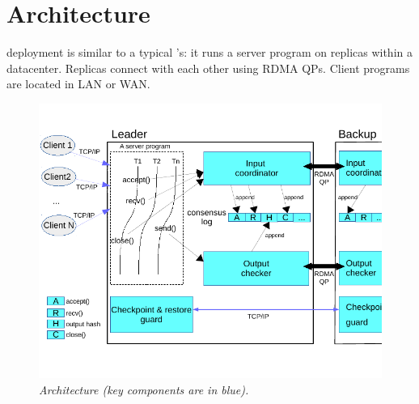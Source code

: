 \section{Architecture} \label{sec:arch}

\xxx deployment is similar to a typical \smr's: it runs a server program on 
replicas within a datacenter. Replicas connect with each other using RDMA QPs. 
Client programs are located in LAN or WAN.

\begin{figure}[ht]
\begin{center}
\includegraphics{figures/arch}
\caption{\em \xxx Architecture (key components are in
  blue).}\label{fig:arch}
\end{center}
\end{figure}